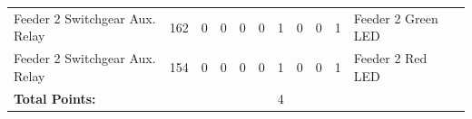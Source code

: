 \begin{table}[!htp]
{\begin{tabular}{lcccccccccll}
			Feeder 2 Switchgear Aux. Relay          & 162                     & 0                                           & 0                                          & 0           & 0           & 1            & 0                & 0 & 1                            & Feeder 2 Green LED               &                \\
			Feeder 2 Switchgear Aux. Relay          & 154                     & 0                                           & 0                                          & 0           & 0           & 1            & 0                & 0 & 1                            & Feeder 2 Red LED                 &                \\ \midrule
			\textbf{Total Points:}                  &                         &                                             &                                            &             &             & 4            &                  &   &                              &                                  &                \\ \bottomrule
		\end{tabular}
	}
\end{table}

